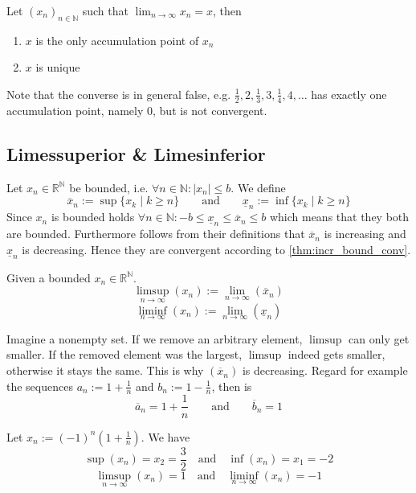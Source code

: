 \begin{theorem}
   Let \((x_n)_{n \in \mathbb{N}}\) such that \(\lim_{n \to \infty} x_n = x\), then
   \begin{enumerate}[label=\roman*, align=Center]
      \item \(x\) is the only accumulation point of \(x_n\)
      \item \(x\) is unique
   \end{enumerate}
\end{theorem}
\begin{remark}
   Note that the converse is in general false, e.g. \(\frac{1}{2}, 2, \frac{1}{3}, 3, \frac{1}{4}, 4, \ldots\) has exactly one accumulation point, namely 0, but is not convergent.
\end{remark}

\subsection{Limessuperior \& Limesinferior}
Let \(x_n \in \mathbb{R}^\mathbb{N}\) be bounded, i.e. \(\forall n \in \mathbb{N}: |x_n| \leq b\).
We define
\[\overline{x}_n := \sup\{x_k \mid k \geq n\} \qquad\text{and}\qquad \underline{x}_n := \inf\{x_k \mid k \geq n\}\]
Since \(x_n\) is bounded holds \(\forall n \in \mathbb{N}: -b \leq \underline{x}_n \leq \overline{x}_n \leq b\) which means that they both are bounded.
Furthermore follows from their definitions that \(\overline{x}_n\) is increasing and \(\underline{x}_n\) is decreasing.
Hence they are convergent according to \cref{thm:incr_bound_conv}.

\begin{definition}
   Given a bounded \(x_n \in \mathbb{R}^\mathbb{N}\).
   \[\limsup_{n \to \infty}(x_n) := \lim_{n \to \infty}(\overline{x}_n)\]
   \[\liminf_{n \to \infty}(x_n) := \lim_{n \to \infty}(\underline{x}_n)\]
\end{definition}
\begin{remark}[Intuition]
   Imagine a nonempty set.
   If we remove an arbitrary element, \(\limsup\) can only get smaller.
   If the removed element was the largest, \(\limsup\) indeed gets smaller, otherwise it stays the same.
   This is why \((\overline{x}_n)\) is decreasing.
   Regard for example the sequences \(a_n := 1 + \frac{1}{n}\) and \(b_n := 1 - \frac{1}{n}\), then is
   \[\overline{a}_n = 1 + \frac{1}{n} \qquad\text{and}\qquad \overline{b}_n = 1\]
\end{remark}
\begin{example}
   Let \(x_n := (-1)^n \left(1 + \frac{1}{n}\right)\).
   We have
   \[\sup(x_n) = x_2 = \frac{3}{2} \quad\text{and}\quad \inf(x_n) = x_1 = -2\]
   \[\limsup_{n \to \infty}(x_n) = 1 \quad\text{and}\quad \liminf_{n \to \infty}(x_n) = -1\]
\end{example}

